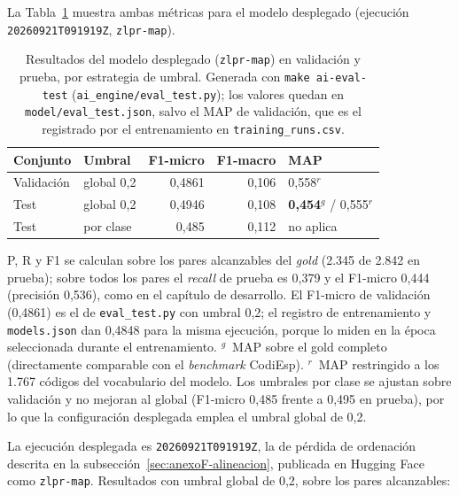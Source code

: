 La Tabla~\ref{tab:final-results} muestra ambas métricas para el modelo desplegado (ejecución \texttt{20260921T091919Z}, \texttt{zlpr-map}).

\begin{table}[H]
\centering
\caption[Resultados del modelo desplegado (\texttt{zlpr-map}) en validación y prueba, por estrategia de umbral]{Resultados del modelo desplegado (\texttt{zlpr-map}) en validación y prueba, por estrategia de umbral. Generada con \texttt{make ai-eval-test} (\texttt{ai\_engine/\allowbreak eval\_test.py}); los valores quedan en \texttt{model/\allowbreak eval\_test.json}, salvo el MAP de validación, que es el registrado por el entrenamiento en \texttt{training\_runs.csv}.}
\label{tab:final-results}
\begin{tabular}{llrrl}
\hline
\textbf{Conjunto} & \textbf{Umbral} & \textbf{F1-micro} & \textbf{F1-macro} & \textbf{MAP} \\
\hline
Validación & global 0,2 & 0{,}4861 & 0{,}106 & 0{,}558$^{r}$ \\
Test       & global 0,2 & 0{,}4946 & 0{,}108 & \textbf{0{,}454}$^{g}$ / 0{,}555$^{r}$ \\
Test       & por clase  & 0{,}485  & 0{,}112 & no aplica \\
\hline
\end{tabular}

\smallskip\par\footnotesize P, R y F1 se calculan sobre los pares alcanzables del \emph{gold} (2.345 de 2.842 en prueba); sobre todos los pares el \emph{recall} de prueba es 0,379 y el F1-micro 0,444 (precisión 0,536), como en el capítulo de desarrollo. El F1-micro de validación (0,4861) es el de \texttt{eval\_test.py} con umbral 0,2; el registro de entrenamiento y \texttt{models.json} dan 0,4848 para la misma ejecución, porque lo miden en la época seleccionada durante el entrenamiento. $^{g}$~MAP sobre el gold completo (directamente comparable con el \emph{benchmark} CodiEsp). $^{r}$~MAP restringido a los 1.767 códigos del vocabulario del modelo. Los umbrales por clase se ajustan sobre validación y no mejoran al global (F1-micro 0,485 frente a 0,495 en prueba), por lo que la configuración desplegada emplea el umbral global de 0,2.
\end{table}

La ejecución desplegada es \texttt{20260921T091919Z}, la de pérdida de ordenación descrita en la subsección~\ref{sec:anexoF-alineacion}, publicada en Hugging Face como \texttt{zlpr-map}. Resultados con umbral global de 0,2, sobre los pares alcanzables:

